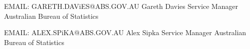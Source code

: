

\begin{cventries}

  \cventry
    {EMAIL: GARETH.DAViES@ABS.GOV.AU} %
    {Gareth Davies} %
    {Service Manager} %
    {Australian Bureau of Statistics} %
    {}

  \cventry
    {EMAIL: ALEX.SPiKA@ABS.GOV.AU} %
    {Alex Sipka } %
    {Service Manager} %
    {Australian Bureau of Statistics} %
    {}

\end{cventries}
